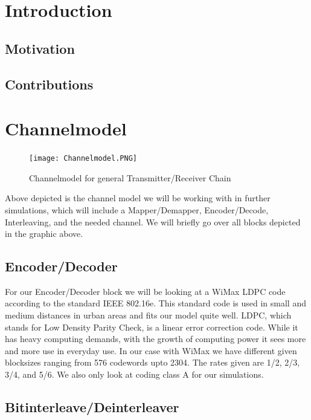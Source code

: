 \documentclass[12pt,oneside, reqno]{report}
\begin{document}
\newpage
{}
\listoffigures

%

\newpage
\thispagestyle{empty}
\null
\newpage
\chapter{Introduction}
\section{Motivation}
\section{Contributions}

\newpage
\chapter{Channelmodel}
\label{sec:channel}
\begin{figure}[H]
	\centering
	\texttt{[image: Channelmodel.PNG]}
	\caption{Channelmodel for general Transmitter/Receiver Chain}
	\label{fig:Channelmodel}
\end{figure}

Above depicted is the channel model we will be working with in further simulations, which will include a Mapper/Demapper, Encoder/Decode, Interleaving, and the needed channel. We will briefly go over all blocks depicted in the graphic above.

\section{Encoder/Decoder}

For our Encoder/Decoder block we will be looking at a WiMax LDPC code according to the standard IEEE 802.16e. This standard code is used in small and medium distances in urban areas and fits our model quite well. LDPC, which stands for Low Density Parity Check, is a linear error correction code. While it has heavy computing demands, with the growth of computing power it sees more and more use in everyday use. In our case with WiMax we have different given blocksizes ranging from 576 codewords upto 2304. The rates given are 1/2, 2/3, 3/4, and 5/6. We also only look at coding class A for our simulations. 


\section{Bitinterleave/Deinterleaver}
\end{document}
